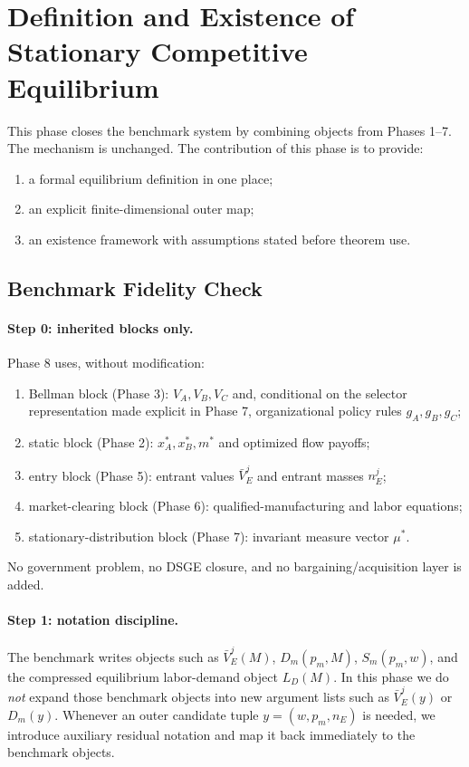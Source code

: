 \section{Definition and Existence of Stationary Competitive Equilibrium}

This phase closes the benchmark system by combining objects from Phases 1--7. The mechanism is unchanged. The contribution of this phase is to provide:
\begin{enumerate}
    \item a formal equilibrium definition in one place;
    \item an explicit finite-dimensional outer map;
    \item an existence framework with assumptions stated before theorem use.
\end{enumerate}

\subsection{Benchmark Fidelity Check}

\paragraph{Step 0: inherited blocks only.}
Phase 8 uses, without modification:
\begin{enumerate}
    \item Bellman block (Phase 3): $V_A,V_B,V_C$ and, conditional on the selector representation made explicit in Phase 7, organizational policy rules $g_A,g_B,g_C$;
    \item static block (Phase 2): $x_A^*,x_B^*,m^*$ and optimized flow payoffs;
    \item entry block (Phase 5): entrant values $\bar V_E^j$ and entrant masses $n_E^j$;
    \item market-clearing block (Phase 6): qualified-manufacturing and labor equations;
    \item stationary-distribution block (Phase 7): invariant measure vector $\mu^*$.
\end{enumerate}
No government problem, no DSGE closure, and no bargaining/acquisition layer is added.

\paragraph{Step 1: notation discipline.}
The benchmark writes objects such as $\bar V_E^j(M)$, $D_m(p_m,M)$, $S_m(p_m,w)$, and the compressed equilibrium labor-demand object $L_D(M)$. In this phase we do \emph{not} expand those benchmark objects into new argument lists such as $\bar V_E^j(y)$ or $D_m(y)$. Whenever an outer candidate tuple $y=(w,p_m,n_E)$ is needed, we introduce auxiliary residual notation and map it back immediately to the benchmark objects.

